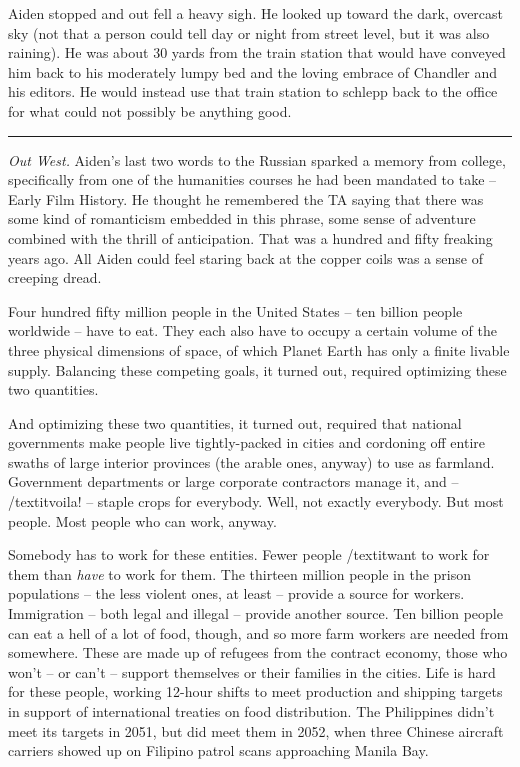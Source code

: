 \documentclass[11pt]{book}
\begin{document}
	Aiden stopped and out fell a heavy sigh. He looked up toward the dark, overcast sky (not that a person could tell day or night from street level, but it was also raining). He was about 30 yards from the train station that would have conveyed him back to his moderately lumpy bed and the loving embrace of Chandler and his editors. He would instead use that train station to schlepp back to the office for what could not possibly be anything good.
	
	\vspace{0.5cm}
	\hrule
	\vspace{0.5cm}
	
	\textit{Out West.} Aiden's last two words to the Russian sparked a memory from college, specifically from one of the humanities courses he had been mandated to take -- Early Film History. He thought he remembered the TA saying that there was some kind of romanticism embedded in this phrase, some sense of adventure combined with the thrill of anticipation. That was a hundred and fifty freaking years ago. All Aiden could feel staring back at the copper coils was a sense of creeping dread.
	
	Four hundred fifty million people in the United States -- ten billion people worldwide -- have to eat. They each also have to occupy a certain volume of the three physical dimensions of space, of which Planet Earth has only a finite livable supply. Balancing these competing goals, it turned out, required optimizing these two quantities.
	
	And optimizing these two quantities, it turned out, required that national governments make people live tightly-packed in cities and cordoning off entire swaths of large interior provinces (the arable ones, anyway) to use as farmland. Government departments or large corporate contractors manage it, and -- /textit{voila!} -- staple crops for everybody. Well, not exactly everybody. But most people. Most people who can work, anyway.
	
	Somebody has to work for these entities. Fewer people /textit{want} to work for them than \textit{have} to work for them. The thirteen million people in the prison populations -- the less violent ones, at least -- provide a source for workers. Immigration -- both legal and illegal -- provide another source. Ten billion people can eat a hell of a lot of food, though, and so more farm workers are needed from somewhere. These are made up of refugees from the contract economy, those who won't -- or can't -- support themselves or their families in the cities. Life is hard for these people, working 12-hour shifts to meet production and shipping targets in support of international treaties on food distribution. The Philippines didn't meet its targets in 2051, but did meet them in 2052, when three Chinese aircraft carriers showed up on Filipino patrol scans approaching Manila Bay.
	
\end{document}
